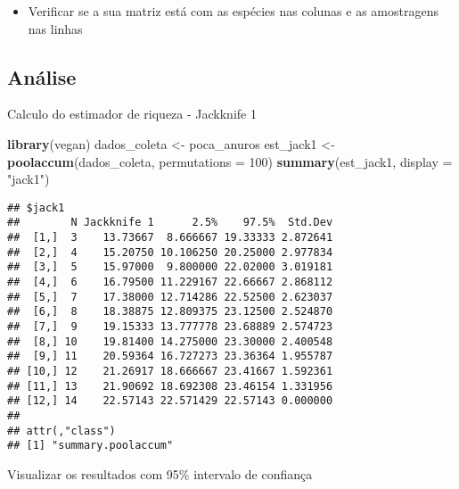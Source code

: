 \documentclass[
]{book}
\newenvironment{Shaded}{\begin{snugshade}}{\end{snugshade}}
\newcommand{\DataTypeTok}[1]{\textcolor[rgb]{0.13,0.29,0.53}{#1}}
\newcommand{\DecValTok}[1]{\textcolor[rgb]{0.00,0.00,0.81}{#1}}
\newcommand{\KeywordTok}[1]{\textcolor[rgb]{0.13,0.29,0.53}{\textbf{#1}}}
\newcommand{\NormalTok}[1]{#1}
\newcommand{\StringTok}[1]{\textcolor[rgb]{0.31,0.60,0.02}{#1}}
\providecommand{\tightlist}{%
  \setlength{\itemsep}{0pt}\setlength{\parskip}{0pt}}
\begin{document}
\begin{itemize}
\tightlist
\item
  Verificar se a sua matriz está com as espécies nas colunas e as amostragens nas linhas
\end{itemize}

\hypertarget{anuxe1lise-3}{%
\subsection{Análise}\label{anuxe1lise-3}}

Calculo do estimador de riqueza - Jackknife 1

\begin{Shaded}
\begin{Highlighting}[]
\KeywordTok{library}\NormalTok{(vegan)}
\NormalTok{dados_coleta <-}\StringTok{ }\NormalTok{poca_anuros}
\NormalTok{est_jack1 <-}\StringTok{ }\KeywordTok{poolaccum}\NormalTok{(dados_coleta, }\DataTypeTok{permutations =} \DecValTok{100}\NormalTok{)}
\KeywordTok{summary}\NormalTok{(est_jack1, }\DataTypeTok{display =} \StringTok{"jack1"}\NormalTok{)}
\end{Highlighting}
\end{Shaded}

\begin{verbatim}
## $jack1
##        N Jackknife 1      2.5%    97.5%  Std.Dev
##  [1,]  3    13.73667  8.666667 19.33333 2.872641
##  [2,]  4    15.20750 10.106250 20.25000 2.977834
##  [3,]  5    15.97000  9.800000 22.02000 3.019181
##  [4,]  6    16.79500 11.229167 22.66667 2.868112
##  [5,]  7    17.38000 12.714286 22.52500 2.623037
##  [6,]  8    18.38875 12.809375 23.12500 2.524870
##  [7,]  9    19.15333 13.777778 23.68889 2.574723
##  [8,] 10    19.81400 14.275000 23.30000 2.400548
##  [9,] 11    20.59364 16.727273 23.36364 1.955787
## [10,] 12    21.26917 18.666667 23.41667 1.592361
## [11,] 13    21.90692 18.692308 23.46154 1.331956
## [12,] 14    22.57143 22.571429 22.57143 0.000000
## 
## attr(,"class")
## [1] "summary.poolaccum"
\end{verbatim}

Visualizar os resultados com 95\% intervalo de confiança
\end{document}

